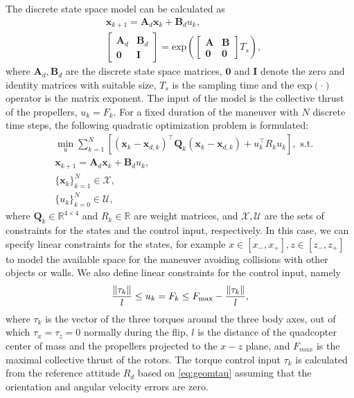 The discrete state space model can be calculated as \cite{linearsys}
\begin{align}
    & \mathbf x_{k+1} = \mathbf A_d \mathbf x_k + \mathbf B_d u_k,\\
    & \begin{bmatrix} {\mathbf A_{d}} & {\mathbf B_{d}} \\ {\mathbf 0} & {\mathbf I} \end{bmatrix}= \mathrm{exp}\left({{\begin{bmatrix} \mathbf{A} & {\mathbf B} \\ \mathbf{0} & \mathbf{0} \end{bmatrix}}T_s}\right),
\end{align}
where $\mathbf A_d, \mathbf B_d$ are the discrete state space matrices, $\mathbf 0$ and $\mathbf I$ denote the zero and identity matrices with suitable size, $T_s$ is the sampling time and the exp$(\cdot)$ operator is the matrix exponent. The input of the model is the collective thrust of the propellers, $u_k=F_k$. For a fixed duration of the maneuver with $N$ discrete time steps, the following quadratic optimization problem is formulated:
\begin{subequations}\label{eq:quadprog}
    \begin{align}
        &\min_u \sum_{k=1}^N \left[ \left(\mathbf x_k-\mathbf x_{d,k}\right)^\top \mathbf Q_k  \left(\mathbf x_k-\mathbf x_{d,k}\right) + u_k^\top R_k u_k\right], \text{ s.t.}\\
        &\mathbf x_{k+1} = \mathbf A_d \mathbf x_k +\mathbf B_d u_k,\\
        &\{ \mathbf x_{k}\}_{k=1}^N \in \mathcal{X},\\
        &\{u_{k}\}_{k=0}^N \in \mathcal{U},
    \end{align}
\end{subequations}
where $\mathbf Q_k\in \mathbb{R}^{4\times 4}$ and $R_k \in\mathbb{R}$ are weight matrices, and $\mathcal{X}, \mathcal{U}$ are the sets of constraints for the states and the control input, respectively. In this case, we can specify linear constraints for the states, for example $x\in[x_-,x_+], z\in[z_-, z_+]$ to model the available space for the maneuver avoiding collisions with other objects or walls. We also define linear constraints for the control input, namely
    \begin{align}
        \frac{\norm{\tau_k}}{l} \leq u_k = F_k \leq F_\mathrm{max}-\frac{\norm{\tau_k}}{l},
    \end{align}
where $\tau_k$ is the vector of the three torques around the three body axes, out of which $\tau_x=\tau_z=0$ normally during the flip, $l$ is the distance of the quadcopter center of mass and the propellers projected to the $x-z$ plane, and $F_{max}$ is the maximal collective thrust of the rotors. The torque control input $\tau_k$ is calculated from the reference attitude $R_d$ based on \eqref{eq:geomtau} assuming that the orientation and angular velocity errors are zero.

